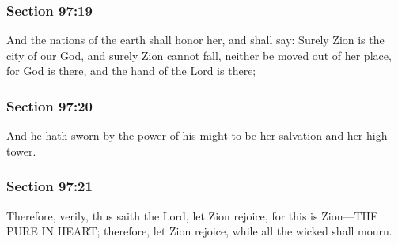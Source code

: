 	\subsubsection{Section 97:19} %
		\label{DC97-19}

		And the nations of the earth shall honor her, and shall say: Surely Zion is the city of our God, and surely Zion cannot fall, neither be moved out of her place, for God is there, and the hand of the Lord is there;


	\subsubsection{Section 97:20} %
		\label{DC97-20}

		And he hath sworn by the power of his might to be her salvation and her high tower.


	\subsubsection{Section 97:21} %
		\label{DC97-21}

		Therefore, verily, thus saith the Lord, let Zion rejoice, for this is Zion---THE PURE IN HEART; therefore, let Zion rejoice, while all the wicked shall mourn.



